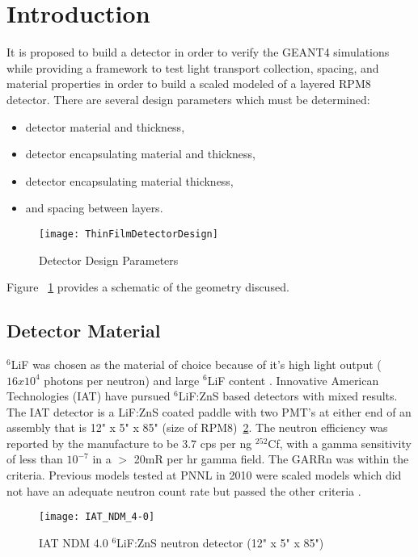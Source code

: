 \section{Introduction}
It is proposed to build a detector in order to verify the GEANT4 simulations while providing a framework to test light transport collection, spacing, and material properties in order to build a scaled modeled of a layered RPM8 detector.
There are several design parameters which must be determined:
\begin{itemize}
    \item detector material and thickness,
    \item detector encapsulating material and thickness,
    \item detector encapsulating material thickness,
    \item and spacing between layers.
\end{itemize}
\begin{figure}
    \centering
    \texttt{[image: ThinFilmDetectorDesign]}
    \caption{Detector Design Parameters}
    \label{fig:DetectorParameterSchematic}
\end{figure}
Figure ~\ref{fig:DetectorParameterSchematic} provides a schematic of the geometry discused.
\subsection{Detector Material}
${}^6$LiF was chosen as the material of choice because of it's high light output ($16x10^4$ photons per neutron) and large ${}^{6}$LiF content \cite{carel_w.e_inorganic-scintillator_2001}. 
Innovative American Technologies (IAT) have pursued ${}^6$LiF:ZnS based detectors with mixed results.
The IAT detector is a LiF:ZnS coated paddle with two PMT's at either end of an assembly that is 12" x 5" x 85" (size of RPM8)~\ref{fig:IATPaddle}.
The neutron efficiency was reported by the manufacture to be 3.7 cps per ng ${}^{252}$Cf, with a gamma sensitivity of less than $10^{-7}$ in a $>$ 20mR per hr gamma field.  The GARRn was within the criteria.
Previous models tested at PNNL in 2010 were scaled models which did not have an adequate neutron count rate but passed the other criteria \cite{kouzes_lithium_2010}.
\begin{figure}
    \centering
    \texttt{[image: IAT\_NDM\_4-0]}
    \caption{IAT NDM 4.0 ${}^6$LiF:ZnS neutron detector (12" x 5" x 85")}
    \label{fig:IATPaddle}
\end{figure}

